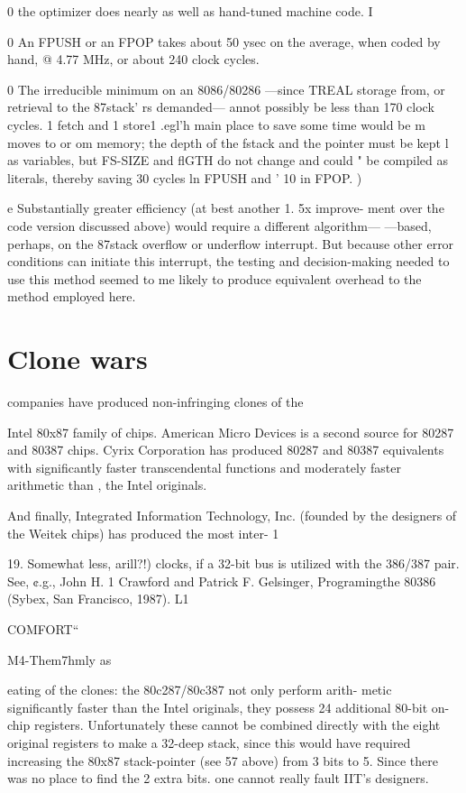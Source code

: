 {0 the optimizer does nearly as well as hand-tuned machine code. I

0 An FPUSH or an FPOP takes about 50 ysec on the average,
when coded by hand, @ 4.77 MHz, or about 240 clock cycles.

0 The irreducible minimum on an 8086/80286 —since TREAL
storage from, or retrieval to the 87stack' rs demanded— annot
possibly be less than 170 clock cycles. 1 fetch and 1 store1 .egl'h
main place to save some time would be m moves to or om
memory; the depth of the fstack and the pointer must be kept l
as variables, but FS-SIZE and flGTH do not change and could "
be compiled as literals, thereby saving 30 cycles ln FPUSH and '
10 in FPOP. )

e Substantially greater efficiency (at best another 1. 5x improve-
ment over the code version discussed above) would require a
different algorithm— —based, perhaps, on the 87stack overflow
or underflow interrupt. But because other error conditions can
initiate this interrupt, the testing and decision-making needed
to use this method seemed to me likely to produce equivalent
overhead to the method employed here.

 

\section{Clone wars}

 companies have produced non-infringing clones of the

Intel 80x87 family of chips. American Micro Devices is a second
source for 80287 and 80387 chips. Cyrix Corporation has
produced 80287 and 80387 equivalents with significantly faster
transcendental functions and moderately faster arithmetic than ,
the Intel originals.

And finally, Integrated Information Technology, Inc. (founded by
the designers of the Weitek chips) has produced the most inter- 1

 

19. Somewhat less, arill?!) clocks, if a 32-bit bus is utilized with the 386/387 pair. See, ¢.g., John H. 1
Crawford and Patrick F. Gelsinger, Programingthe 80386 (Sybex, San Francisco, 1987). L1

COMFORT“

M4-Them7hmly as

eating of the clones: the 80c287/80c387 not only perform arith-
metic significantly faster than the Intel originals, they possess 24
additional 80-bit on-chip registers. Unfortunately these cannot
be combined directly with the eight original registers to make a
32-deep stack, since this would have required increasing the
80x87 stack-pointer (see 57 above) from 3 bits to 5. Since there
was no place to find the 2 extra bits. one cannot really fault IIT's
designers.

}
